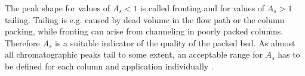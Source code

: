 The peak shape for values of $A_{s} < 1$ is called fronting and for values of $A_{s} > 1$ tailing. Tailing is e.g. caused by dead volume in the flow path or the column packing, while fronting can arise from channeling in poorly packed columns. Therefore $A_{s}$ is a suitable indicator of the quality of the packed bed. As almost all chromatographic peaks tail to some extent, an acceptable range for $A_{s}$ has to be defined for each column and application individually \cite{SWB-414874366}.  
\FloatBarrier
% 
% 
% 
